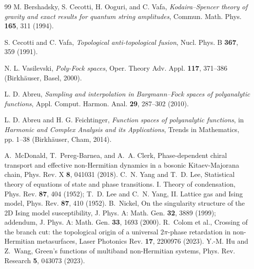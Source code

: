 \documentclass[11pt,a4paper]{article}
\begin{document}
\begin{thebibliography}{99}
M. Bershadsky, S. Cecotti, H. Ooguri, and C. Vafa,
\emph{Kodaira--Spencer theory of gravity and exact results for quantum string amplitudes},
Commun. Math. Phys. \textbf{165}, 311 (1994).

S. Cecotti and C. Vafa,
\emph{Topological anti-topological fusion},
Nucl. Phys. B \textbf{367}, 359 (1991).

N. L. Vasilevski,
\emph{Poly-Fock spaces},
Oper. Theory Adv. Appl. \textbf{117}, 371--386 (Birkh\"auser, Basel, 2000).

L. D. Abreu,
\emph{Sampling and interpolation in Bargmann--Fock spaces of polyanalytic functions},
Appl. Comput. Harmon. Anal. \textbf{29}, 287--302 (2010).

L. D. Abreu and H. G. Feichtinger,
\emph{Function spaces of polyanalytic functions},
in \emph{Harmonic and Complex Analysis and its Applications}, Trends in Mathematics,
pp. 1--38 (Birkh\"auser, Cham, 2014).

 A.~McDonald, T.~Pereg-Barnea, and A.~A. Clerk, Phase-dependent chiral transport and effective non-Hermitian dynamics in a bosonic Kitaev-Majorana chain, Phys. Rev. X \textbf{8}, 041031 (2018).
 C.~N. Yang and T.~D. Lee, Statistical theory of equations of state and phase transitions. I. Theory of condensation, Phys. Rev. \textbf{87}, 404 (1952); T.~D. Lee and C.~N. Yang, II. Lattice gas and Ising model, Phys. Rev. \textbf{87}, 410 (1952).
 B.~Nickel, On the singularity structure of the 2D Ising model susceptibility, J. Phys. A: Math. Gen. \textbf{32}, 3889 (1999); addendum, J. Phys. A: Math. Gen. \textbf{33}, 1693 (2000).
 R.~Colom et al., Crossing of the branch cut: the topological origin of a universal $2\pi$-phase retardation in non-Hermitian metasurfaces, Laser Photonics Rev. \textbf{17}, 2200976 (2023).
 Y.-M. Hu and Z.~Wang, Green's functions of multiband non-Hermitian systems, Phys. Rev. Research \textbf{5}, 043073 (2023).
\end{thebibliography}
\end{document}
